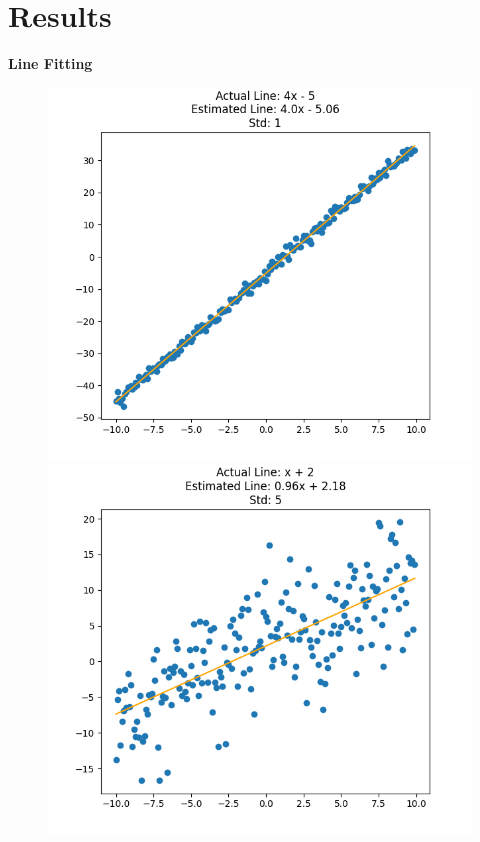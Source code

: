 \documentclass[12pt]{article}
\begin{document}
\section{Results}
\textbf{Line Fitting}
\begin{figure}[H] 
\centering 
\includegraphics[scale=0.33]{line1.png}
\includegraphics[scale=0.33]{line2.png}  

\end{figure}
\end{document}
